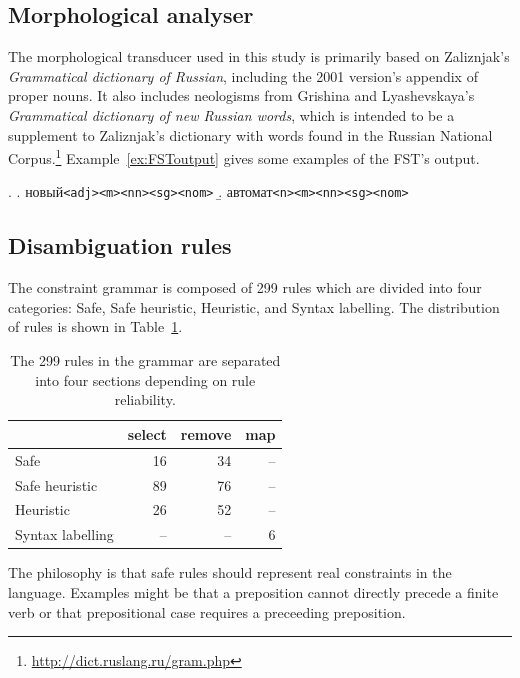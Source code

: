 \documentclass[11pt]{article}
\newcommand{\rus}[1]{\foreignlanguage{russian}{#1}}
\begin{document}
\subsection{Morphological analyser}
\label{sec:morph}

The morphological transducer used in this study is 
primarily based on Zaliznjak's \emph{Grammatical dictionary of Russian}, 
including the 2001 version's appendix of proper nouns. It also includes neologisms
from Grishina and Lyashevskaya's \emph{Grammatical dictionary of new Russian words},
which is intended to be a supplement to Zaliznjak's dictionary with words found in
the Russian National Corpus.\footnote{\url{http://dict.ruslang.ru/gram.php}} 
Example~\ref{ex:FSToutput} gives some examples of the FST's output.

\ex. \label{ex:FSToutput} 
	\a. \rus{новый}\texttt{{\small <adj><m><nn><sg><nom>}}
	\b. \rus{автомат}\texttt{{<m><nn><sg><nom>}}

\subsection{Disambiguation rules}

The constraint grammar is composed of 299 rules which are divided into four
categories: Safe, Safe heuristic, Heuristic, and Syntax labelling. The distribution
of rules is shown in Table~\ref{tab:ruleDist}.

\begin{table}[hb]
  \centering
  \begin{tabular}{lrrr}
    \hline
                     & {\sc select} & {\sc remove} & {\sc map} \\
    \hline
    Safe             &   16         &   34         &  -- \\
    Safe heuristic   &   89         &   76         &  -- \\
    Heuristic        &   26         &   52         &  -- \\
    Syntax labelling & --           & --           & 6 \\ 
    \hline
  \end{tabular}
  \caption{The 299 rules in the grammar are separated into four sections depending
      on rule reliability. }
  \label{tab:ruleDist}
\end{table}

The philosophy is that safe rules should represent real constraints in
the language. Examples might be that a preposition cannot directly precede a finite verb
or that prepositional case requires a preceeding preposition. 
\end{document}
